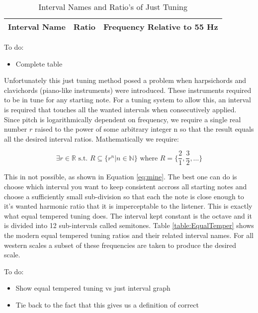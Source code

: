 \begin{table}[h]
\centering
\caption{Interval Names and Ratio's of Just Tuning}
\begin{tabu} to \textwidth { | X[l] | X[c] | X[r] | }
	\hline \bf Interval Name & \bf Ratio  & Frequency Relative to 55 Hz \\
	\hline
\end{tabu}
\label{tab:JustTuning}
\end{table}

\color{red}
To do:
\begin{itemize}
	\item Complete table
\end{itemize}
\color{black}

\noindent Unfortunately this just tuning method posed a problem when harpsichords
and clavichords (piano-like instruments) were introduced. These instruments
required to be in tune for any starting note. For a tuning system to allow this,
an interval is required that touches all the wanted intervals when consecutively
applied. Since pitch is logarithmically dependent on frequency, we require a
single real number $r$ raised to the power of some arbitrary integer n so that the
result equals all the desired interval ratios.  Mathematically we require:

\begin{equation}\label{GeneralRationalTheorem}
	\exists r \in \mathbb{R} \text{ s.t. } R \subseteq \{ r^n | n \in \mathbb{N} \}
	\text{ where } R = \{ \frac{2}{1}, \frac{3}{2}, \dots \}
\end{equation}

\noindent This in not possible, as shown in Equation \ref{eq:mine}. The best one
can do is choose which interval you want to keep consistent accross all starting
notes and choose a sufficiently small sub-division so that each the note is close
enough to it's wanted harmonic ratio that it is imperceptable to the listener.
This is exactly what equal tempered tuning does. The interval kept constant is the
octave and it is divided into 12 sub-intervals called semitones. Table
\ref{table:EqualTemper} shows the modern equal tempered tuning ratios and their
related interval names. For all western scales a subset of these frequencies are
taken to produce the desired scale.

\color{red}
To do:
\begin{itemize}
	\item Show equal tempered tuning vs just interval graph
	\item Tie back to the fact that this gives us a definition of correct
\end{itemize}
\color{black}

